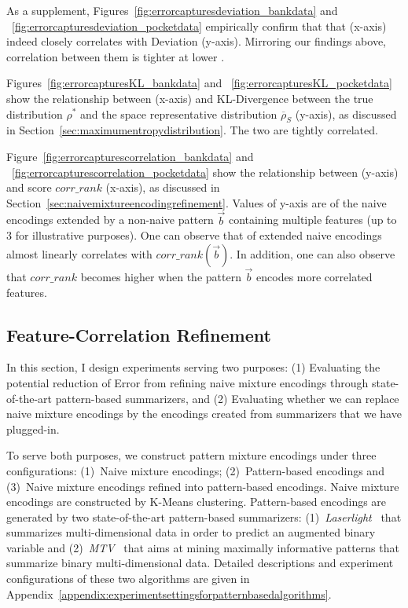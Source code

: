 As a supplement, Figures~\ref{fig:errorcapturesdeviation_bankdata} and ~\ref{fig:errorcapturesdeviation_pocketdata} empirically confirm that that \errorname (x-axis) indeed closely correlates with Deviation (y-axis).
Mirroring our findings above, correlation between them is tighter at lower \errorname.

Figures~\ref{fig:errorcapturesKL_bankdata} and ~\ref{fig:errorcapturesKL_pocketdata} show the relationship between \errorname (x-axis) and KL-Divergence between the true distribution $\rho^*$ and the space representative distribution $\overline{\rho}_S$ (y-axis), as discussed in Section~\ref{sec:maximumentropydistribution}. The two are tightly correlated.

Figure~\ref{fig:errorcapturescorrelation_bankdata} and ~\ref{fig:errorcapturescorrelation_pocketdata} show the relationship between \errorname (y-axis) and score $corr\_rank$ (x-axis), as discussed in Section~\ref{sec:naivemixtureencodingrefinement}. Values of y-axis are \errorname of the naive encodings extended by a non-naive pattern $\vec{b}$ containing multiple features (up to 3 for illustrative purposes). 
One can observe that \errorname of extended naive encodings almost linearly correlates with $corr\_rank(\vec b)$. 
In addition, one can also observe that $corr\_rank$ becomes higher when the pattern $\vec{b}$ encodes more correlated features. 

\subsection{Feature-Correlation Refinement}
\label{sec:motivatepatternmixturesummaries}
In this section, I design experiments serving two purposes: (1) Evaluating the potential reduction of Error from refining naive mixture encodings through state-of-the-art pattern-based summarizers, and (2) Evaluating whether we can replace naive mixture encodings by the encodings created from summarizers that we have plugged-in.


To serve both purposes, we construct pattern mixture encodings under three configurations: (1)~Naive mixture encodings; (2)~Pattern-based encodings and (3)~Naive mixture encodings refined into pattern-based encodings.
Naive mixture encodings are constructed by K-Means clustering. 
Pattern-based encodings are generated by two state-of-the-art pattern-based summarizers: 
(1)~\textit{Laserlight}~\cite{DBLP:journals/pvldb/GebalyAGKS14} that summarizes multi-dimensional data in order to predict an augmented binary variable and 
(2)~\textit{MTV}~\cite{DBLP:journals/tkdd/MampaeyVT12} that aims at mining maximally informative patterns that summarize binary multi-dimensional data. 
Detailed descriptions and experiment configurations of these two algorithms are given in Appendix~\ref{appendix:experimentsettingsforpatternbasedalgorithms}.

